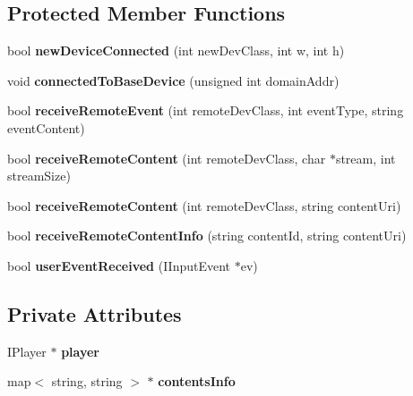 \subsection*{Protected Member Functions}
\begin{CompactItemize}
\item 
bool {\bf newDeviceConnected} (int newDevClass, int w, int h)\label{classbr_1_1pucrio_1_1telemidia_1_1ginga_1_1ncl_1_1multidevice_1_1FormatterActiveDevice_4820c061de3b177c376e96dd45c4fca0}

\item 
void \textbf{connectedToBaseDevice} (unsigned int domainAddr)\label{classbr_1_1pucrio_1_1telemidia_1_1ginga_1_1ncl_1_1multidevice_1_1FormatterActiveDevice_f7e3b3635d3e38bed8ead0321733791b}

\item 
bool \textbf{receiveRemoteEvent} (int remoteDevClass, int eventType, string eventContent)\label{classbr_1_1pucrio_1_1telemidia_1_1ginga_1_1ncl_1_1multidevice_1_1FormatterActiveDevice_d0ee06b25589fbeea9b03c945ff41b29}

\item 
bool {\bf receiveRemoteContent} (int remoteDevClass, char $\ast$stream, int streamSize)\label{classbr_1_1pucrio_1_1telemidia_1_1ginga_1_1ncl_1_1multidevice_1_1FormatterActiveDevice_f4051428a3f94469cac462ee8e875bd5}

\item 
bool \textbf{receiveRemoteContent} (int remoteDevClass, string contentUri)\label{classbr_1_1pucrio_1_1telemidia_1_1ginga_1_1ncl_1_1multidevice_1_1FormatterActiveDevice_a70ef1a18d742b5c8d124330f1c37871}

\item 
bool \textbf{receiveRemoteContentInfo} (string contentId, string contentUri)\label{classbr_1_1pucrio_1_1telemidia_1_1ginga_1_1ncl_1_1multidevice_1_1FormatterActiveDevice_d1057c4c80f1db9849210468a0f3bad9}

\item 
bool \textbf{userEventReceived} (IInputEvent $\ast$ev)\label{classbr_1_1pucrio_1_1telemidia_1_1ginga_1_1ncl_1_1multidevice_1_1FormatterActiveDevice_1520ea57105d2db3e7f818b4d60667af}

\end{CompactItemize}
\subsection*{Private Attributes}
\begin{CompactItemize}
\item 
IPlayer $\ast$ {\bf player}\label{classbr_1_1pucrio_1_1telemidia_1_1ginga_1_1ncl_1_1multidevice_1_1FormatterActiveDevice_977a4dfa7c350d9028a3bb60be00e0c1}

\item 
map$<$ string, string $>$ $\ast$ {\bf contentsInfo}\label{classbr_1_1pucrio_1_1telemidia_1_1ginga_1_1ncl_1_1multidevice_1_1FormatterActiveDevice_4fb26a784864b62420ae63b3338a79a2}

\end{CompactItemize}


